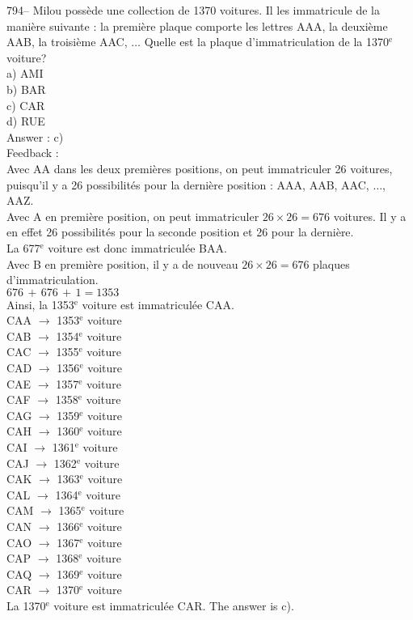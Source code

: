 \documentclass[letterpaper, 12pt]{article}
\begin{document}
794-- Milou poss\`ede une collection de 1370 voitures.  Il les immatricule
de la mani\`ere suivante : la premi\`ere plaque comporte les lettres AAA, la
deuxi\`eme AAB, la troisi\`eme AAC, $\ldots$  Quelle est la plaque
d'immatriculation de la 1370$^{\textrm{e}}$ voiture?\\
a) AMI\\
b) BAR\\
c) CAR\\
d) RUE\\

Answer : c)\\

Feedback : \\
Avec AA dans les deux premi\`eres positions, on peut immatriculer 26
voitures, puisqu'il y a 26 possibilit\'es pour la derni\`ere position : AAA,
AAB, AAC, $\ldots$, AAZ.\\
Avec A en premi\`ere position, on peut immatriculer $26\times26=676$
voitures. Il y a en effet 26 possibilit\'es pour la seconde position et 26
pour la derni\`ere.  \\
La 677$^{\textrm{e}}$ voiture est donc immatricul\'ee BAA.\\
Avec B en premi\`ere position, il y a de nouveau $26\times26=676$ plaques
d'immatriculation.\\
$676\,+\,676\,+\,1=1353$\\
Ainsi, la 1353$^{\textrm{e}}$ voiture est immatricul\'ee CAA.\\
CAA $\longrightarrow$ 1353$^{\textrm{e}}$ voiture\\
CAB $\longrightarrow$ 1354$^{\textrm{e}}$ voiture\\
CAC $\longrightarrow$ 1355$^{\textrm{e}}$ voiture\\
CAD $\longrightarrow$ 1356$^{\textrm{e}}$ voiture\\
CAE $\longrightarrow$ 1357$^{\textrm{e}}$ voiture\\
CAF $\longrightarrow$ 1358$^{\textrm{e}}$ voiture\\
CAG $\longrightarrow$ 1359$^{\textrm{e}}$ voiture\\
CAH $\longrightarrow$ 1360$^{\textrm{e}}$ voiture \\
CAI $\longrightarrow$ 1361$^{\textrm{e}}$ voiture\\
CAJ $\longrightarrow$ 1362$^{\textrm{e}}$ voiture\\
CAK $\longrightarrow$ 1363$^{\textrm{e}}$ voiture\\
CAL $\longrightarrow$ 1364$^{\textrm{e}}$ voiture\\
CAM $\longrightarrow$ 1365$^{\textrm{e}}$ voiture\\
CAN $\longrightarrow$ 1366$^{\textrm{e}}$ voiture\\
CAO $\longrightarrow$ 1367$^{\textrm{e}}$ voiture\\
CAP $\longrightarrow$ 1368$^{\textrm{e}}$ voiture\\
CAQ $\longrightarrow$ 1369$^{\textrm{e}}$ voiture\\
CAR $\longrightarrow$ 1370$^{\textrm{e}}$ voiture\\
La 1370$^{\textrm{e}}$ voiture est immatricul\'ee CAR. The answer is
c).\\
\end{document}
